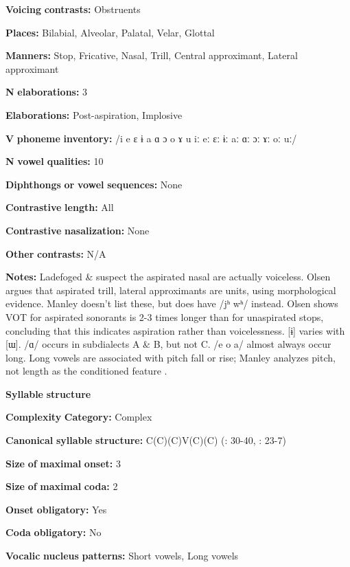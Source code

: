 \begin{styleBody}
\textbf{Voicing} \textbf{contrasts:} Obstruents

\textbf{Places:} Bilabial, Alveolar, Palatal, Velar, Glottal

\textbf{Manners:} Stop, Fricative, Nasal, Trill, Central approximant, Lateral approximant

\textbf{N} \textbf{elaborations:} 3

\textbf{Elaborations:} Post-aspiration, Implosive

\textbf{V} \textbf{phoneme} \textbf{inventory:} /i e ɛ ɨ a ɑ ɔ o ɤ u iː eː ɛː ɨː aː ɑː ɔː ɤː oː uː/

\textbf{N} \textbf{vowel} \textbf{qualities:} 10

\textbf{Diphthongs} \textbf{or} \textbf{vowel} \textbf{sequences:} None

\textbf{Contrastive} \textbf{length:} All

\textbf{Contrastive} \textbf{nasalization:} None

\textbf{Other} \textbf{contrasts:} N/A

\textbf{Notes:} Ladefoged \& \citet[116]{Maddieson1996} suspect the aspirated nasal are actually voiceless. Olsen argues that aspirated trill, lateral approximants are units, using morphological evidence. Manley doesn’t list these, but does have /jʰ wʰ/ instead. Olsen shows VOT for aspirated sonorants is 2-3 times longer than for unaspirated stops, concluding that this indicates aspiration rather than voicelessness. [ɨ] varies with [ɯ]. /ɑ/ occurs in subdialects A \& B, but not C. /e o a/ almost always occur long. Long vowels are associated with pitch fall or rise; Manley analyzes pitch, not length as the conditioned feature \citep[15]{Manley1972}.

\textbf{Syllable} \textbf{structure}

\textbf{Complexity} \textbf{Category:} Complex

\textbf{Canonical} \textbf{syllable} \textbf{structure:} C(C)(C)V(C)(C) (\citealt{Olsen2014}: 30-40, \citealt{Manley1972}: 23-7)

\textbf{Size} \textbf{of} \textbf{maximal} \textbf{onset:} 3

\textbf{Size} \textbf{of} \textbf{maximal} \textbf{coda:} 2

\textbf{Onset} \textbf{obligatory:} Yes

\textbf{Coda} \textbf{obligatory:} No

\textbf{Vocalic} \textbf{nucleus} \textbf{patterns:} Short vowels, Long vowels


\end{styleBody}
